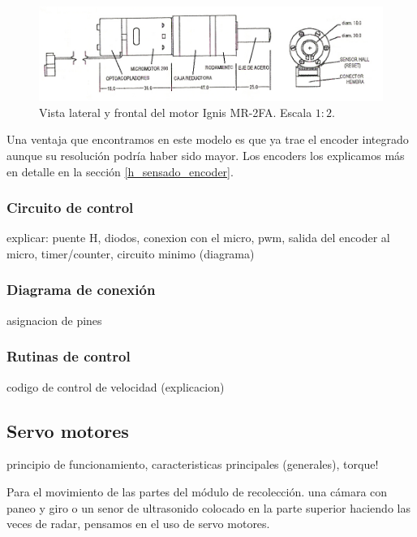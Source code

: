 \begin{figure}[ht]
	\centering
	\includegraphics[scale=1]{MR2-FA.png}
	\caption{Vista lateral y frontal del motor Ignis MR-2FA. Escala $1:2$.}
	\label{hF_motorDC}
\end{figure}

Una ventaja que encontramos en este modelo es que ya trae el encoder integrado aunque su resoluci\'on podr\'ia haber sido mayor.
Los encoders los explicamos m\'as en detalle en la secci\'on \ref{h_sensado_encoder}.

\subsubsection{Circuito de control}
\label{h_actuadores_motorDC_circuito}

explicar: puente H, diodos, conexion con el micro, pwm, salida del encoder al micro, timer/counter, circuito minimo (diagrama)

\subsubsection{Diagrama de conexi\'on}
\label{h_actuadores_motorDC_diagrama}

asignacion de pines

\subsubsection{Rutinas de control}
\label{h_actuadores_motorDC_rutinas}

codigo de control de velocidad (explicacion)

\subsection{Servo motores}
\label{h_actuadores_servo}

principio de funcionamiento, caracteristicas principales (generales), torque!

Para el movimiento de las partes del m\'odulo de recolecci\'on. una c\'amara con paneo y giro o un senor de ultrasonido colocado
en la parte superior haciendo las veces de radar, pensamos en el uso de servo motores.

